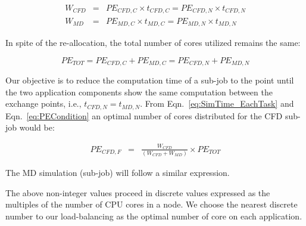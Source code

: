 \documentclass[preprint,12pt]{elsarticle}
\begin{document}
\vspace{-.2em}
\footnotesize
\begin{eqnarray}
W_{CFD}&=&PE_{CFD,C}\times t_{CFD,C}=PE_{CFD,N}\times t_{CFD,N} \nonumber \\
W_{MD}&=&PE_{MD,C}\times t_{MD,C}=PE_{MD,N}\times t_{MD,N}
\label{eq:SimTime_EachTask}
\end{eqnarray}
\normalsize

In spite of the re-allocation, the total number of cores utilized remains the same:

\vspace{-.2em}
\footnotesize
\begin{equation}
PE_{TOT}=PE_{CFD,C}+PE_{MD,C}=PE_{CFD,N}+PE_{MD,N}
\label{eq:PECondition}
\end{equation}
\normalsize

Our objective is to reduce the computation time of a sub-job to the point until the two application components show the same computation between the exchange points, i.e., $t_{CFD,N} = t_{MD,N}$. From Eqn.~\ref{eq:SimTime_EachTask} and Eqn.~\ref{eq:PECondition} an optimal number of cores distributed for the CFD sub-job would be:

\vspace{-.2em}
\footnotesize
\begin{eqnarray}
PE_{CFD,F} & = & \frac {W_{CFD}} {(W_{CFD} + W_{MD})} \times PE_{TOT}
\end{eqnarray}
\normalsize

The MD simulation (sub-job) will follow a similar expression.

The above non-integer values proceed in discrete values expressed as the multiples of the number of CPU cores in a node. We choose the nearest discrete number to our load-balancing as the optimal number of core on each application.
\end{document}
